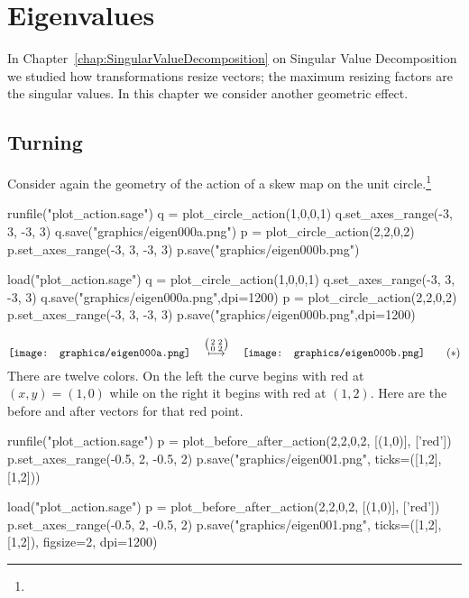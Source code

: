 \chapter{Eigenvalues}

In Chapter~\ref{chap:SingularValueDecomposition} on 
Singular Value Decomposition we studied how
transformations resize vectors; the maximum resizing factors
are the singular values.
In this chapter we consider another geometric effect.


\section{Turning}
Consider again the geometry of the action of a skew map on the unit 
circle.\footnote{\noterightmult}
\begin{sageoutput}
runfile("plot_action.sage")  
q = plot_circle_action(1,0,0,1) 
q.set_axes_range(-3, 3, -3, 3) 
q.save("graphics/eigen000a.png")
p = plot_circle_action(2,2,0,2) 
p.set_axes_range(-3, 3, -3, 3) 
p.save("graphics/eigen000b.png")
\end{sageoutput}
\begin{sagesilent}
load("plot_action.sage")  
q = plot_circle_action(1,0,0,1) 
q.set_axes_range(-3, 3, -3, 3) 
q.save("graphics/eigen000a.png",dpi=1200)
p = plot_circle_action(2,2,0,2) 
p.set_axes_range(-3, 3, -3, 3) 
p.save("graphics/eigen000b.png",dpi=1200)
\end{sagesilent}
\begin{equation*}
  \vcenteredhbox{\texttt{[image: graphics/eigen000a.png]}}
  \quad\mapsunder{\big (\begin{smallmatrix} 2 &2 \\ 0 &2 \end{smallmatrix}\big )}\quad
  \vcenteredhbox{\texttt{[image: graphics/eigen000b.png]}}
  \tag{$*$}
\end{equation*}
There are twelve colors.
On the left the curve begins with red at $(x,y)=(1,0)$
while on the right it begins with red at $(1,2)$.
Here are the before and after vectors for that red point.
\begin{sageoutput}[d,0,1;d,2,4]
runfile("plot_action.sage")  
p = plot_before_after_action(2,2,0,2, [(1,0)], ['red']) 
p.set_axes_range(-0.5, 2, -0.5, 2) 
p.save("graphics/eigen001.png", ticks=([1,2],[1,2]))
\end{sageoutput}
\begin{sagesilent}
load("plot_action.sage")  
p = plot_before_after_action(2,2,0,2, [(1,0)], ['red']) 
p.set_axes_range(-0.5, 2, -0.5, 2) 
p.save("graphics/eigen001.png", ticks=([1,2],[1,2]), figsize=2, dpi=1200)
\end{sagesilent}
